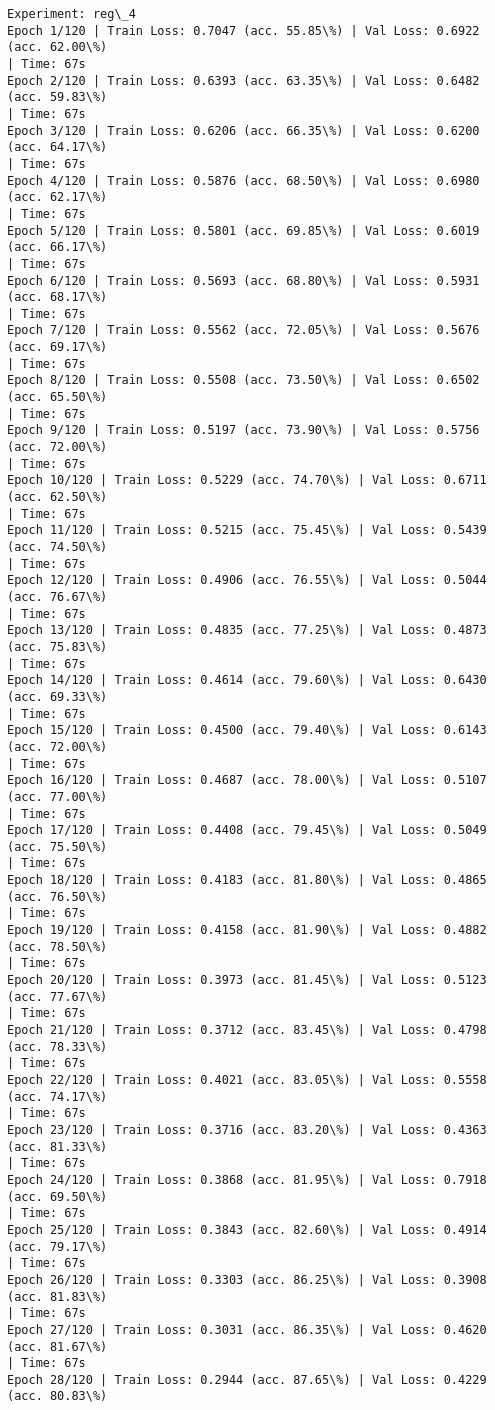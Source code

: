 \documentclass[8pt]{extarticle}
\begin{document}
\begin{Verbatim}[commandchars=\\\{\}]
Experiment: reg\_4
Epoch 1/120 | Train Loss: 0.7047 (acc. 55.85\%) | Val Loss: 0.6922 (acc. 62.00\%)
| Time: 67s
Epoch 2/120 | Train Loss: 0.6393 (acc. 63.35\%) | Val Loss: 0.6482 (acc. 59.83\%)
| Time: 67s
Epoch 3/120 | Train Loss: 0.6206 (acc. 66.35\%) | Val Loss: 0.6200 (acc. 64.17\%)
| Time: 67s
Epoch 4/120 | Train Loss: 0.5876 (acc. 68.50\%) | Val Loss: 0.6980 (acc. 62.17\%)
| Time: 67s
Epoch 5/120 | Train Loss: 0.5801 (acc. 69.85\%) | Val Loss: 0.6019 (acc. 66.17\%)
| Time: 67s
Epoch 6/120 | Train Loss: 0.5693 (acc. 68.80\%) | Val Loss: 0.5931 (acc. 68.17\%)
| Time: 67s
Epoch 7/120 | Train Loss: 0.5562 (acc. 72.05\%) | Val Loss: 0.5676 (acc. 69.17\%)
| Time: 67s
Epoch 8/120 | Train Loss: 0.5508 (acc. 73.50\%) | Val Loss: 0.6502 (acc. 65.50\%)
| Time: 67s
Epoch 9/120 | Train Loss: 0.5197 (acc. 73.90\%) | Val Loss: 0.5756 (acc. 72.00\%)
| Time: 67s
Epoch 10/120 | Train Loss: 0.5229 (acc. 74.70\%) | Val Loss: 0.6711 (acc. 62.50\%)
| Time: 67s
Epoch 11/120 | Train Loss: 0.5215 (acc. 75.45\%) | Val Loss: 0.5439 (acc. 74.50\%)
| Time: 67s
Epoch 12/120 | Train Loss: 0.4906 (acc. 76.55\%) | Val Loss: 0.5044 (acc. 76.67\%)
| Time: 67s
Epoch 13/120 | Train Loss: 0.4835 (acc. 77.25\%) | Val Loss: 0.4873 (acc. 75.83\%)
| Time: 67s
Epoch 14/120 | Train Loss: 0.4614 (acc. 79.60\%) | Val Loss: 0.6430 (acc. 69.33\%)
| Time: 67s
Epoch 15/120 | Train Loss: 0.4500 (acc. 79.40\%) | Val Loss: 0.6143 (acc. 72.00\%)
| Time: 67s
Epoch 16/120 | Train Loss: 0.4687 (acc. 78.00\%) | Val Loss: 0.5107 (acc. 77.00\%)
| Time: 67s
Epoch 17/120 | Train Loss: 0.4408 (acc. 79.45\%) | Val Loss: 0.5049 (acc. 75.50\%)
| Time: 67s
Epoch 18/120 | Train Loss: 0.4183 (acc. 81.80\%) | Val Loss: 0.4865 (acc. 76.50\%)
| Time: 67s
Epoch 19/120 | Train Loss: 0.4158 (acc. 81.90\%) | Val Loss: 0.4882 (acc. 78.50\%)
| Time: 67s
Epoch 20/120 | Train Loss: 0.3973 (acc. 81.45\%) | Val Loss: 0.5123 (acc. 77.67\%)
| Time: 67s
Epoch 21/120 | Train Loss: 0.3712 (acc. 83.45\%) | Val Loss: 0.4798 (acc. 78.33\%)
| Time: 67s
Epoch 22/120 | Train Loss: 0.4021 (acc. 83.05\%) | Val Loss: 0.5558 (acc. 74.17\%)
| Time: 67s
Epoch 23/120 | Train Loss: 0.3716 (acc. 83.20\%) | Val Loss: 0.4363 (acc. 81.33\%)
| Time: 67s
Epoch 24/120 | Train Loss: 0.3868 (acc. 81.95\%) | Val Loss: 0.7918 (acc. 69.50\%)
| Time: 67s
Epoch 25/120 | Train Loss: 0.3843 (acc. 82.60\%) | Val Loss: 0.4914 (acc. 79.17\%)
| Time: 67s
Epoch 26/120 | Train Loss: 0.3303 (acc. 86.25\%) | Val Loss: 0.3908 (acc. 81.83\%)
| Time: 67s
Epoch 27/120 | Train Loss: 0.3031 (acc. 86.35\%) | Val Loss: 0.4620 (acc. 81.67\%)
| Time: 67s
Epoch 28/120 | Train Loss: 0.2944 (acc. 87.65\%) | Val Loss: 0.4229 (acc. 80.83\%)

\end{Verbatim}
\end{document}
